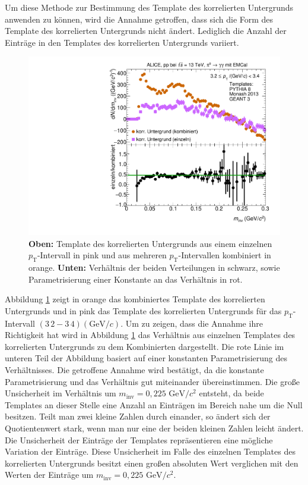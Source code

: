 Um diese Methode zur Bestimmung des Template des korrelierten Untergrunds anwenden zu können, wird die Annahme getroffen, dass sich die Form des Template des korrelierten Untergrunds nicht ändert.
Lediglich die Anzahl der Einträge in den Templates des korrelierten Untergrunds variiert.
\begin{figure}[t!]
\centering
\includegraphics[width=.7\linewidth]{BackgroundWithRatio10_Data_2016.pdf}
\caption{\textbf{Oben:} Template des korrelierten Untergrunds aus einem einzelnen $p_\text{T}$-Intervall in pink und aus mehreren $p_\text{T}$-Intervallen kombiniert in orange.
\textbf{Unten:} Verhältnis der beiden Verteilungen in schwarz, sowie Parametrisierung einer Konstante an das Verhältnis in rot.}
\label{fig:BkgTempRatio}
\end{figure}
\newline
Abbildung \ref{fig:BkgTempRatio} zeigt in orange das kombiniertes Template des korrelierten Untergrunds und in pink das Template des korrelierten Untergrunds für das $p_\text{T}$-Intervall $(3\,2 - 3\,4) (\text{GeV/}c)$.
Um zu zeigen, dass die Annahme ihre Richtigkeit hat wird in Abbildung \ref{fig:BkgTempRatio} das Verhältnis aus einzelnen Templates des korrelierten Untergrunds zu dem Kombinierten dargestellt.
Die rote Linie im unteren Teil der Abbildung basiert auf einer konstanten Parametrisierung des Verhältnisses.
Die getroffene Annahme wird bestätigt, da die konstante Parametrisierung und das Verhältnis gut miteinander übereinstimmen.
Die große Unsicherheit im Verhältnis um $m_\text{inv} = 0,225\text{ GeV}/c^{2}$ entsteht, da beide Templates an dieser Stelle eine Anzahl an Einträgen im Bereich nahe um die Null besitzen.
Teilt man zwei kleine Zahlen durch einander, so ändert sich der Quotientenwert stark, wenn man nur eine der beiden kleinen Zahlen leicht ändert.
Die Unsicherheit der Einträge der Templates repräsentieren eine mögliche Variation der Einträge.
Diese Unsicherheit im Falle des einzelnen Templates des korrelierten Untergrunds besitzt einen großen absoluten Wert verglichen mit den Werten der Einträge um $m_\text{inv} = 0,225\text{ GeV}/c^{2}$.
